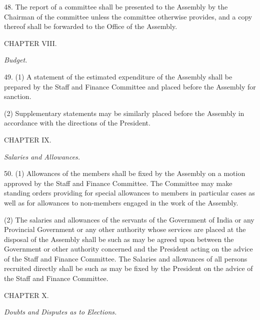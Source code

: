 48. The report of a committee shall be presented to the Assembly by the Chairman of the committee unless the committee otherwise provides, and a copy thereof shall be forwarded to the Office of the Assembly.



\begin{center}
CHAPTER VIII.\end{center}
\begin{center}
\emph{Budget.}\end{center}


49. (1) A statement of the estimated expenditure of the Assembly shall be prepared by the Staff and Finance Committee and placed before the Assembly for sanction.



(2) Supplementary statements may be similarly placed before the Assembly in accordance with the directions of the President.



\begin{center}
CHAPTER IX.\end{center}
\begin{center}
\emph{Salaries and Allowances.}\end{center}


50. (1) Allowances of the members shall be fixed by the Assembly on a motion approved by the Staff and Finance Committee. The Committee may make standing orders providing for special allowances to members in particular cases as well as for allowances to non-members engaged in the work of the Assembly.



(2) The salaries and allowances of the servants of the Government of India or any Provincial Government or any other authority whose services are placed at the disposal of the Assembly shall be such as may be agreed upon between the Government or other authority concerned and the President acting on the advice of the Staff and Finance Committee. The Salaries and allowances of all persons recruited directly shall be such as may be fixed by the President on the advice of the Staff and Finance Committee.



\begin{center}
CHAPTER X.\end{center}
\begin{center}
\emph{Doubts and Disputes as to Elections.}\end{center}


